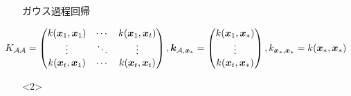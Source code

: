 \documentclass[dvipdfmx, 10.5pt]{beamer}
\begin{document}
\begin{frame}{\insertsubsection}
\begin{block}{ガウス過程回帰}
\begin{onlyenv}
		\begin{tiny}
			\begin{align*}
				\hspace*{-15mm}
				K_{\mathcal{A} \mathcal{A}}
				=
				\begin{pmatrix}
					k(\bm x_{ 1}, \bm x_{ 1}) &
					\cdots &
					k(\bm x_{ 1}, \bm x_{ t}) \\
					\vdots &
					\ddots &
					\vdots \\ 	 
					k(\bm x_{ t}, \bm x_{ 1}) &
					\cdots &
					k(\bm x_{ t}, \bm x_{t}) 
				\end{pmatrix},
				\bm k_{\mathcal{A} ,{\bm x}_\ast}
				=
				\begin{pmatrix}
					k(\bm x_{ 1}, \bm x_\ast) \\
					\vdots \\
					k(\bm x_{ t}, \bm x_\ast) 
				\end{pmatrix},		 %
				k_{{\bm x}_\ast, {\bm x}_\ast}
				=
				k(\bm x_{\ast}, \bm x_{\ast})
			\end{align*}
		\end{tiny}
	\end{onlyenv}

	\begin{onlyenv}
		\begin{itemize}
			\vspace{18pt}
			\vspace{18pt}
		\end{itemize}
	\end{onlyenv}
\end{block}
\end{frame}

\end{document}
